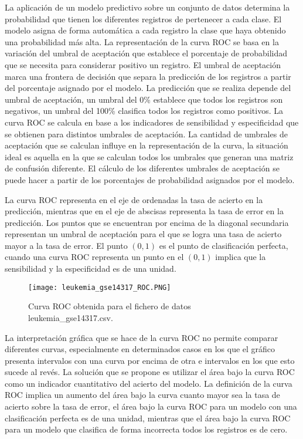 La aplicación de un modelo predictivo sobre un conjunto de datos determina la probabilidad que tienen los diferentes registros de pertenecer a cada clase. El modelo asigna de forma automática a cada registro la clase que haya obtenido una probabilidad más alta. La representación de la curva ROC se basa en la variación del umbral de aceptación que establece el porcentaje de probabilidad que se necesita para considerar positivo un registro. El umbral de aceptación marca una frontera de decisión que separa la predicción de los registros a partir del porcentaje asignado por el modelo. La predicción que se realiza depende del umbral de aceptación, un umbral del 0\% establece que todos los registros son negativos, un umbral del 100\% clasifica todos los registros como positivos. La curva ROC se calcula en base a los indicadores de sensibilidad y especificidad que se obtienen para distintos umbrales de aceptación. La cantidad de umbrales de aceptación que se calculan influye en la representación de la curva, la situación ideal es aquella en la que se calculan todos los umbrales que generan una matriz de confusión diferente. El cálculo de los diferentes umbrales de aceptación se puede hacer a partir de los porcentajes de probabilidad asignados por el modelo.

\bigbreak

La curva ROC representa en el eje de ordenadas la tasa de acierto en la predicción, mientras que en el eje de abscisas representa la tasa de error en la predicción. Los puntos que se encuentran por encima de la diagonal secundaria representan un umbral de aceptación para el que se logra una tasa de acierto mayor a la tasa de error. El punto $(0, 1)$ es el punto de clasificación perfecta, cuando una curva ROC representa un punto en el $(0, 1)$ implica que la sensibilidad y la especificidad es de una unidad. 

\bigbreak

\begin{figure}[htp]
    \centering
    \texttt{[image: leukemia\_gse14317\_ROC.PNG]}
    \caption{Curva ROC obtenida para el fichero de datos leukemia\_gse14317.csv.}
    \label{fig:5}
\end{figure}



La interpretación gráfica que se hace de la curva ROC no permite comparar diferentes curvas, especialmente en determinados casos en los que el gráfico presenta intervalos con una curva por encima de otra e intervalos en los que esto sucede al revés. La solución que se propone es utilizar el área bajo la curva ROC como un indicador cuantitativo del acierto del modelo. La definición de la curva ROC implica un aumento del área bajo la curva cuanto mayor sea la tasa de acierto sobre la tasa de error, el área bajo la curva ROC para un modelo con una clasificación perfecta es de una unidad, mientras que el área bajo la curva ROC para un modelo que clasifica de forma incorrecta todos los registros es de cero.

